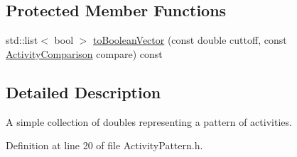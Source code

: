 \subsection*{\-Protected \-Member \-Functions}
\begin{DoxyCompactItemize}
\item 
std\-::list$<$ bool $>$ \hyperlink{classcryomesh_1_1state_1_1ActivityPattern_a0d002a277bcb38447e738349593ae0af}{to\-Boolean\-Vector} (const double cuttoff, const \hyperlink{classcryomesh_1_1state_1_1ActivityPattern_a6bd9cf293aeb147f73bb82c67c626142}{\-Activity\-Comparison} compare) const 
\end{DoxyCompactItemize}


\subsection{\-Detailed \-Description}
\-A simple collection of doubles representing a pattern of activities. 

\-Definition at line 20 of file \-Activity\-Pattern.\-h.




